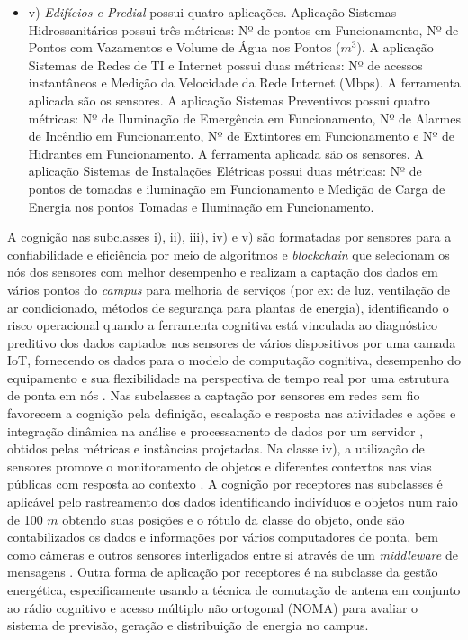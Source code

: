 \documentclass[portuguese]{textolivre}
\begin{document}
\begin{itemize}
    \item v) \textit{Edifícios e Predial} possui quatro aplicações. Aplicação Sistemas Hidrossanitários possui três métricas: Nº de pontos em Funcionamento, Nº de Pontos com Vazamentos e Volume de Água nos Pontos ($m^3$). A aplicação Sistemas de Redes de TI e Internet possui duas métricas: Nº de acessos instantâneos e Medição da Velocidade da Rede Internet (Mbps). A ferramenta aplicada são os sensores. A aplicação Sistemas Preventivos possui quatro métricas: Nº de Iluminação de Emergência em Funcionamento, Nº de Alarmes de Incêndio em Funcionamento, Nº de Extintores em Funcionamento e Nº de Hidrantes em Funcionamento. A ferramenta aplicada são os sensores. A aplicação Sistemas de Instalações Elétricas possui duas métricas: Nº de pontos de tomadas e iluminação em Funcionamento e Medição de Carga de Energia nos pontos Tomadas e Iluminação em Funcionamento.
\end{itemize}
\medskip

A cognição nas subclasses i), ii), iii), iv) e v) são formatadas por sensores para a confiabilidade e eficiência por meio de algoritmos e \textit{blockchain} que selecionam os nós dos sensores com melhor desempenho \cite{rani2022} e realizam a captação dos dados em vários pontos do \textit{campus} para melhoria de serviços (por ex: de luz, ventilação de ar condicionado, métodos de segurança para plantas de energia), identificando o risco operacional quando a ferramenta cognitiva está vinculada ao diagnóstico preditivo dos dados captados nos sensores de vários dispositivos por uma camada IoT, fornecendo os dados para o modelo de computação cognitiva, desempenho do equipamento e sua flexibilidade na perspectiva de tempo real \cite{daniel2021} por uma estrutura de ponta em nós \cite{rausch2021}. Nas subclasses a captação por sensores em redes sem fio favorecem a cognição pela definição, escalação e resposta nas atividades e ações \cite{daniel2021} e integração dinâmica na análise e processamento de dados por um servidor \cite{patra2017}, obtidos pelas métricas e instâncias projetadas. Na classe iv), a utilização de sensores promove o monitoramento de objetos e diferentes contextos nas vias públicas com resposta ao contexto \cite{somov2013, singh2014}. A cognição por receptores nas subclasses é aplicável pelo rastreamento dos dados \cite{rausch2021} identificando indivíduos e objetos num raio de 100 $m$ obtendo suas posições e o rótulo da classe do objeto, onde são contabilizados os dados e informações por vários computadores de ponta, bem como câmeras e outros sensores interligados entre si através de um \textit{middleware} de mensagens \cite{rausch2021}. Outra forma de aplicação por receptores é na subclasse da gestão energética, especificamente usando a técnica de comutação de antena em conjunto ao rádio cognitivo e acesso múltiplo não ortogonal (NOMA) \cite{alzahrani2018} para avaliar o sistema de previsão, geração e distribuição de energia no campus.
\end{document}
